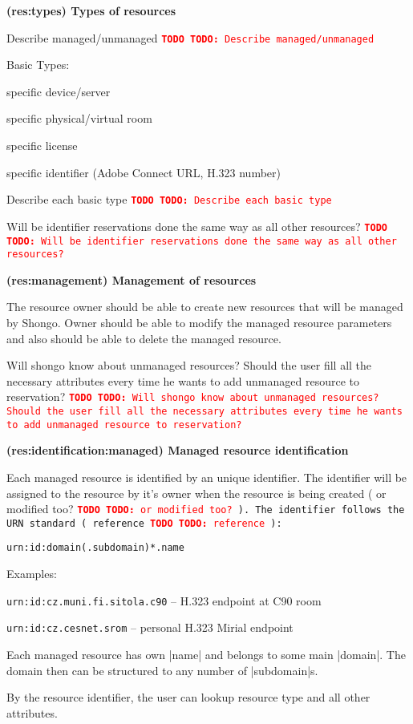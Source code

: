 \documentclass[a4paper]{report}
\makeatletter
\newcounter{UCcounter}
\newenvironment{UseCases}%
	{\begin{list}{\textbf{UC-\arabic{UCcounter}}}{\@nmbrlisttrue\def\@listctr{UCcounter}}}%
	{\end{list}}
\newcommand{\UClabel}[1]{\label{UC:#1}}
\newcommand{\UseCase}[2]{\item\UClabel{#2} \textbf{(#2) #1}\\ \nopagebreak}
\newcommand{\TODO}[1]{%
\def\empty{}%
\def\prvniparametr{#1}%
\ifx\prvniparametr\empty%
\begingroup\tt\textcolor{red}{\noindent\textbf{TODO}}\endgroup
\else%
\begingroup\tt\textcolor{red}{\noindent\textbf{TODO:}\ #1}\endgroup
\fi%
}
\makeatother
\begin{document}
\begin{UseCases}

\UseCase{Types of resources}{res:types}

\TODO{Describe managed/unmanaged}

Basic Types:
\begin{compactitem}
\item specific device/server
\item specific physical/virtual room
\item specific license
\item specific identifier (Adobe Connect URL, H.323 number)
\end{compactitem}
\TODO{Describe each basic type}

\TODO{Will be identifier reservations done the same way as all other resources?}


\UseCase{Management of resources}{res:management}

The resource owner should be able to create new resources that will be managed by Shongo. Owner should be able to modify the managed resource parameters and also should be able to delete the managed resource.

\TODO{Will shongo know about unmanaged resources? Should the user fill all the necessary attributes every time he wants to add unmanaged resource to reservation?}

\UseCase{Managed resource identification}{res:identification:managed}

Each managed resource is identified by an unique identifier. The identifier will be 
assigned to the resource by it's owner when the resource is being created 
(\TODO{or modified too?}). The identifier follows the URN standard (\TODO{reference}):
\begin{verbatim}
urn:id:domain(.subdomain)*.name
\end{verbatim}
Examples: 
\begin{compactitem}
\item \verb|urn:id:cz.muni.fi.sitola.c90| -- H.323 endpoint at C90 room
\item \verb|urn:id:cz.cesnet.srom| -- personal H.323 Mirial endpoint
\end{compactitem}

Each managed resource has own |name| and belongs to some main |domain|. The domain then can be structured to any number of |subdomain|s.

By the resource identifier, the user can lookup resource type and all other attributes.


\end{UseCases}
\end{document}
